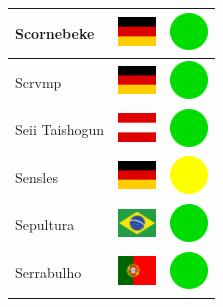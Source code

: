 \documentclass[12pt, a4paper, twoside]{report}
\begin{document}
\begin{center}
\begin{longtable}{|p{5cm}|p{2cm}|p{2cm}|}
			Scornebeke & \includegraphics[width=1cm]{4x3/de} & \includegraphics[width=1cm]{likes/y} \\ \hline
			Scrvmp & \includegraphics[width=1cm]{4x3/de} & \includegraphics[width=1cm]{likes/y} \\ \hline
			Seii Taishogun & \includegraphics[width=1cm]{4x3/at} & \includegraphics[width=1cm]{likes/y} \\ \hline
			Sensles & \includegraphics[width=1cm]{4x3/de} & \includegraphics[width=1cm]{likes/m} \\ \hline
			Sepultura & \includegraphics[width=1cm]{4x3/br} & \includegraphics[width=1cm]{likes/y} \\ \hline
			Serrabulho & \includegraphics[width=1cm]{4x3/pt} & \includegraphics[width=1cm]{likes/y} \\ \hline

\end{longtable}
\end{center}
\end{document}
